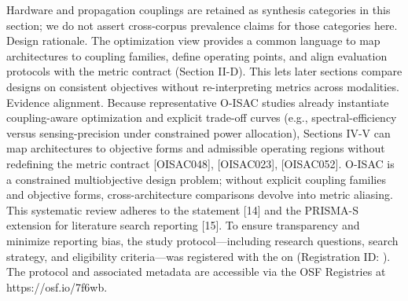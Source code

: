 {}Hardware and propagation couplings are retained as synthesis categories in this section; we do not assert cross-corpus prevalence claims for those categories here.\markdownRendererInterblockSeparator
{}
\markdownRendererSectionEnd \markdownRendererSectionBegin
{}\markdownRendererInterblockSeparator
{}Design rationale. The optimization view provides a common language to map architectures to coupling families, define operating points, and align evaluation protocols with the metric contract (Section II-D). This lets later sections compare designs on consistent objectives without re-interpreting metrics across modalities.\markdownRendererParagraphSeparator
{}Evidence alignment. Because representative O-ISAC studies already instantiate coupling-aware optimization and explicit trade-off curves (e.g., spectral-efficiency versus sensing-precision under constrained power allocation), Sections IV-V can map architectures to objective forms and admissible operating regions without redefining the metric contract [O\markdownRendererUnderscore{}ISAC\markdownRendererUnderscore{}048], [O\markdownRendererUnderscore{}ISAC\markdownRendererUnderscore{}023], [O\markdownRendererUnderscore{}ISAC\markdownRendererUnderscore{}052].\markdownRendererParagraphSeparator
{} O-ISAC is a constrained multiobjective design problem; without explicit coupling families and objective forms, cross-architecture comparisons devolve into metric aliasing.\markdownRendererParagraphSeparator
{}
\markdownRendererSectionEnd 
\markdownRendererSectionEnd 
\markdownRendererSectionEnd \markdownRendererSectionBegin
{}\markdownRendererInterblockSeparator
{}\markdownRendererSectionBegin
{}\markdownRendererInterblockSeparator
{}This systematic review adheres to the  statement [14] and the PRISMA-S extension for literature search reporting [15]. To ensure transparency and minimize reporting bias, the study protocol—including research questions, search strategy, and eligibility criteria—was registered with the  on  (Registration ID: ). The protocol and associated metadata are accessible via the OSF Registries at https://osf.io/7f6wb.\markdownRendererInterblockSeparator
